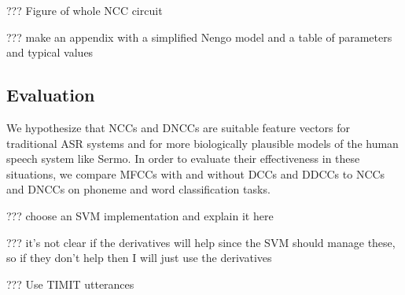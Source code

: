 ??? Figure of whole NCC circuit


??? make an appendix with a simplified Nengo model
and a table of parameters and typical values

\subsection{Evaluation}

We hypothesize that NCCs and DNCCs
are suitable feature vectors
for traditional ASR systems
and for more biologically plausible
models of the human speech system like Sermo.
In order to evaluate their effectiveness
in these situations,
we compare MFCCs with and without DCCs
and DDCCs to NCCs and DNCCs
on phoneme and word classification tasks.

??? choose an SVM implementation and
explain it here

??? it's not clear if the derivatives will help
since the SVM should manage these,
so if they don't help then I will
just use the derivatives

??? Use TIMIT utterances





